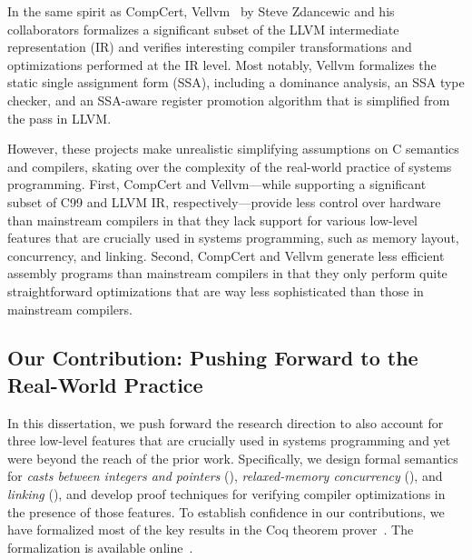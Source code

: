 In the same spirit as CompCert, Vellvm~\cite{vellvm} by Steve Zdancewic and his collaborators
formalizes a significant subset of the LLVM intermediate representation (IR) and verifies
interesting compiler transformations and optimizations performed at the IR level.  Most notably,
Vellvm formalizes the static single assignment form (SSA), including a dominance analysis, an SSA
type checker, and an SSA-aware register promotion algorithm that is simplified from the
 pass in LLVM.


However, these projects make unrealistic simplifying assumptions on C semantics and compilers,
skating over the complexity of the real-world practice of systems programming.  First, CompCert and
Vellvm---while supporting a significant subset of C99 and LLVM IR, respectively---provide less
control over hardware than mainstream compilers in that they lack support for various low-level
features that are crucially used in systems programming, such as memory layout, concurrency, and
linking.  Second, CompCert and Vellvm generate less efficient assembly programs than mainstream
compilers in that they only perform quite straightforward optimizations that are way less
sophisticated than those in mainstream compilers.



\subsection{Our Contribution: Pushing Forward to the Real-World Practice}

In this dissertation, we push forward the research direction to also account for three low-level
features that are crucially used in systems programming and yet were beyond the reach of the prior
work.  Specifically, we design formal semantics for \emph{casts between integers and pointers}
(), \emph{relaxed-memory concurrency} (), and
\emph{linking} (), and develop proof techniques for verifying compiler
optimizations in the presence of those features.  To establish confidence in our contributions, we
have formalized most of the key results in the Coq theorem prover~\cite{coq}.  The formalization is
available online~\cite{kang-phd-thesis-web}.

